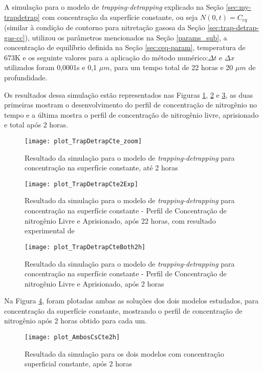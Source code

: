 \FloatBarrier

A simulação para o modelo de \textit{trapping-detrapping} explicado na Seção \ref{sec:my-trapdetrap} com concentração da superfície constante, ou seja $N(0,t)=C_{eq}$ (similar à condição de contorno para nitretação gasosa da Seção \ref{sec:trap-detrap-gas-cc}), utilizou os parâmetros mencionados na Seção \ref{params_sub}, a concentração de equilíbrio definida na Seção \ref{sec:ceq-param}, temperatura de 673K e os seguinte valores para a aplicação do método numérico:$\Delta t$ e $\Delta x$ utilizados foram 0,0001s e 0,1 $\mu m$, para um tempo total de 22 horas e 20 $\mu m$ de profundidade.

Os resultados dessa simulação estão representados nas Figuras \ref{fig:td-cscte1}, \ref{fig:td-cscte-exp} e \ref{fig:td-cscte-both}, as duas primeiras mostram o desenvolvimento do perfil de concentração de nitrogênio no tempo e a última mostra o perfil de concentração de nitrogênio livre, aprisionado e total após 2 horas.

\begin{figure}[hb]
\centering
	\caption{Resultado da simulação para o modelo de \textit{trapping-detrapping} para concentração na superfície constante, até 2 horas}
	\texttt{[image: plot\_TrapDetrapCte\_zoom]}
	\label{fig:td-cscte1}
	\centering
\end{figure}


\begin{figure}[hb]
\centering
	\caption{Resultado da simulação para o modelo de \textit{trapping-detrapping} para concentração na superfície constante - Perfil de Concentração de nitrogênio Livre e Aprisionado, após 22 horas, com resultado experimental de \cite{christiansen2008nitrogen}}
	\texttt{[image: plot\_TrapDetrapCte2Exp]}
	\label{fig:td-cscte-exp}
	\centering
\end{figure}


\begin{figure}[hb]
\centering
	\caption{Resultado da simulação para o modelo de \textit{trapping-detrapping} para concentração na superfície constante - Perfil de Concentração de nitrogênio Livre e Aprisionado, após 2 horas }
	\texttt{[image: plot\_TrapDetrapCteBoth2h]}
	\label{fig:td-cscte-both}
	\centering
\end{figure}


Na Figura \ref{fig:td-cscte-compara}, foram plotadas ambas as soluções dos dois modelos estudados, para concentração da superfície constante, mostrando o perfil de concentração de nitrogênio após 2 horas obtido para cada um.

\begin{figure}[ht]
\centering
	\caption{Resultado da simulação para os dois modelos com concentração superficial constante, após 2 horas }
	\texttt{[image: plot\_AmbosCsCte2h]}
	\label{fig:td-cscte-compara}
	\centering
\end{figure}
\FloatBarrier

